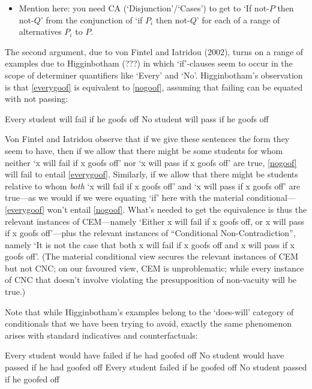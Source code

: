 \documentclass[If.tex]{subfiles}
\begin{document}
\begin{itemize}
	\item
	Mention here: you need CA (‘Disjunction’/‘Cases’) to get to ‘If not-$P$ then not-$Q$’ from the conjunction of ‘if $P_i$ then not-$Q$’ for each of a range of alternatives $P_i$ to $P$. 
\end{itemize}

The second argument, due to von Fintel and Iatridou (2002), turns on a range of examples due to Higginbotham (???) in which ‘if’-clauses seem to occur in the scope of determiner quantifiers like ‘Every’ and ‘No’. Higginbotham's observation is that \ref{everygoof} is equivalent to \ref{nogoof}, assuming that failing can be equated with not passing:
\begin{prop}
	\nitem \label{everygoof}
	Every student will fail if he goofs off
	\nitem \label{nogoof}
	No student will pass if he goofs off
\end{prop}
Von Fintel and Iatridou observe that if we give these sentences the form they seem to have, then if we allow that there might be some students for whom neither ‘x will fail if x goofs off’ nor ‘x will pass if x goofs off’ are true, \ref{nogoof} will fail to entail \ref{everygoof}. Similarly, if we allow that there might be students relative to whom \emph{both} ‘x will fail if x goofs off’ and ‘x will pass if x goofs off’ are true---as we would if we were equating ‘if’ here with the material conditional---\ref{everygoof} won't entail \ref{nogoof}. What's needed to get the equivalence is thus the relevant instances of CEM---namely ‘Either x will fail if x goofs off, or x will pass if x goofs off’---plus the relevant instances of “Conditional Non-Contradiction”, namely ‘It is not the case that both x will fail if x goofs off and x will pass if x goofs off’. (The material conditional view secures the relevant instances of CEM but not CNC; on our favoured view, CEM is unproblematic; while every instance of CNC that doesn't involve violating the presupposition of non-vacuity will be true.)

Note that while Higginbotham's examples belong to the ‘does-will’ category of conditionals that we have been trying to avoid, exactly the same phenomenon arises with standard indicatives and counterfactuals:
\begin{prop}
	\nitem
	Every student would have failed if he had goofed off
	\nitem
	No student would have passed if he had goofed off
	\nitem \label{everygoofpast}
	Every student failed if he goofed off
	\nitem \label{nogoofpast}
	No student passed if he goofed off
\end{prop}
\end{document}
